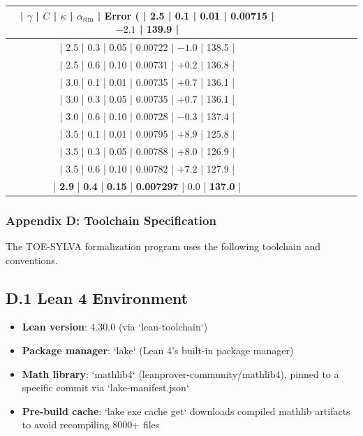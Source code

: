 \documentclass[11pt,a4paper]{article}
\theoremstyle{plain}
\theoremstyle{definition}
\begin{document}
\begin{table}[h]
\centering
\begin{tabular}{|c|c|c|c|c|c|c|c|}
\hline
| $\gamma$ | $C$ | $\kappa$ | $\alpha_{\text{sim}}$ | Error (%
| 2.5 | 0.1 | 0.01 | 0.00715 | $-2.1$ | 139.9 | \\ \hline
| 2.5 | 0.3 | 0.05 | 0.00722 | $-1.0$ | 138.5 | \\ \hline
| 2.5 | 0.6 | 0.10 | 0.00731 | $+0.2$ | 136.8 | \\ \hline
| 3.0 | 0.1 | 0.01 | 0.00735 | $+0.7$ | 136.1 | \\ \hline
| 3.0 | 0.3 | 0.05 | 0.00735 | $+0.7$ | 136.1 | \\ \hline
| 3.0 | 0.6 | 0.10 | 0.00728 | $-0.3$ | 137.4 | \\ \hline
| 3.5 | 0.1 | 0.01 | 0.00795 | $+8.9$ | 125.8 | \\ \hline
| 3.5 | 0.3 | 0.05 | 0.00788 | $+8.0$ | 126.9 | \\ \hline
| 3.5 | 0.6 | 0.10 | 0.00782 | $+7.2$ | 127.9 | \\ \hline
| \textbf{2.9} | \textbf{0.4} | \textbf{0.15} | \textbf{0.007297} | \textbf{$0.0$} | \textbf{137.0} | \\ \hline
\end{tabular}
\end{table}

\textemdash{}

\subsubsection{Appendix D: Toolchain Specification}

The TOE-SYLVA formalization program uses the following toolchain and conventions.

\subsection{D.1 Lean 4 Environment}

\begin{itemize}
\item \textbf{Lean version}: 4.30.0 (via `lean-toolchain`)
\item \textbf{Package manager}: `lake` (Lean 4's built-in package manager)
\item \textbf{Math library}: `mathlib4` (leanprover-community/mathlib4), pinned to a specific commit via `lake-manifest.json`
\item \textbf{Pre-build cache}: `lake exe cache get` downloads compiled mathlib artifacts to avoid recompiling 8000+ files

\end{itemize}
\end{document}
